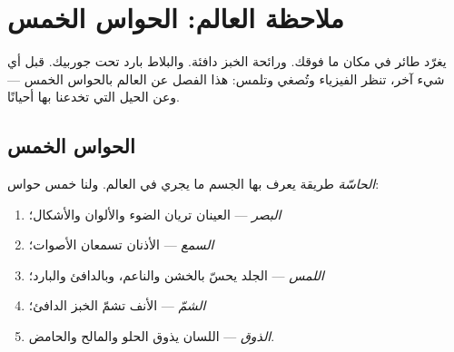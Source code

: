 \chapter{ملاحظة العالم: الحواس الخمس}\label{ch:g1:five-senses}

يغرّد طائر في مكان ما فوقك. ورائحة الخبز دافئة. والبلاط بارد تحت
جوربيك. قبل أي شيء آخر، تنظر الفيزياء وتُصغي وتلمس: هذا الفصل عن
 العالم بالحواس الخمس --- وعن الحيل التي تخدعنا بها أحيانًا.

\section{الحواس الخمس}

\begin{definition}\label{def:g1:five-senses:senses}
\emph{الحاسّة} طريقة يعرف بها الجسم ما يجري في
العالم. ولنا خمس حواس:
\begin{enumerate}
  \item \emph{البصر} --- العينان تريان الضوء والألوان
        والأشكال؛
  \item \emph{السمع} --- الأذنان تسمعان الأصوات؛
  \item \emph{اللمس} --- الجلد يحسّ بالخشن والناعم،
        وبالدافئ والبارد؛
  \item \emph{الشمّ} --- الأنف تشمّ الخبز الدافئ؛
  \item \emph{الذوق} --- اللسان يذوق الحلو والمالح
        والحامض.
\end{enumerate}
\end{definition}


